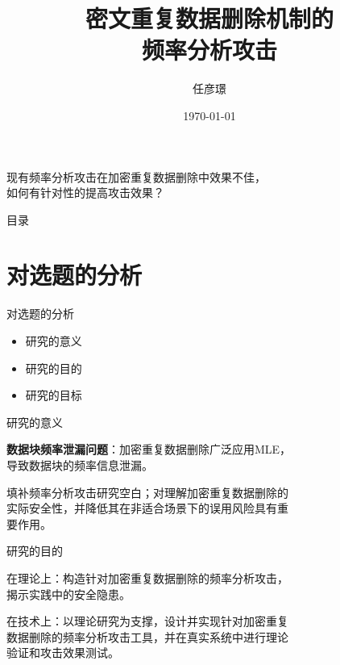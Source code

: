 \documentclass[aspectratio=43]{beamer}
\title{密文重复数据删除机制的\\频率分析攻击}
\date{\today}
\author[Tinoryj]{任彦璟}
\begin{document}
\begin{frame}
\titlepage
\end{frame}

\begin{frame}
\begin{card}
现有频率分析攻击在加密重复数据删除中效果不佳，\\[2mm]如何有针对性的提高攻击效果？
\end{card}
\end{frame}


\begin{frame}{目录}
\begin{card}
\tableofcontents
\end{card}
\end{frame}

\section{对选题的分析}

\begin{frame}{对选题的分析}
\begin{card}
\begin{itemize}
    \item 研究的意义
    \item 研究的目的
    \item 研究的目标
\end{itemize}
\end{card}
\end{frame}

\begin{frame}{研究的意义}
\begin{card}
\textbf{数据块频率泄漏问题}：加密重复数据删除广泛应用MLE，\\[2mm]导致数据块的频率信息泄漏。
\end{card}
\begin{card}
填补频率分析攻击研究空白；对理解加密重复数据删除的\\[2mm]实际安全性，并降低其在非适合场景下的误用风险具有重\\[2mm]要作用。
\end{card}
\end{frame}

\begin{frame}{研究的目的}
\begin{card}
在理论上：构造针对加密重复数据删除的频率分析攻击，\\[2mm]揭示实践中的安全隐患。
\end{card}
\begin{card}
在技术上：以理论研究为支撑，设计并实现针对加密重复\\[2mm]数据删除的频率分析攻击工具，并在真实系统中进行理论\\[2mm]验证和攻击效果测试。 
\end{card}
\end{frame}
\end{document}
